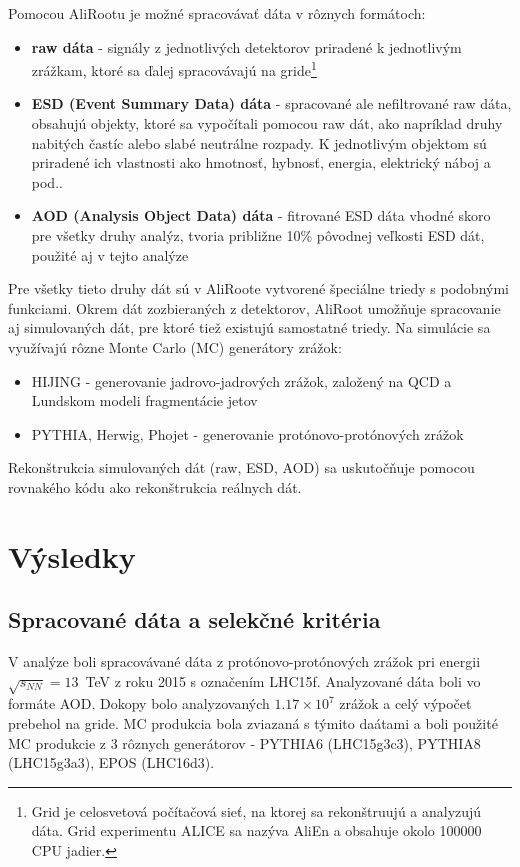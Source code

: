 \documentclass[thesismargins, thesislinespacing]{rnthesis}
\begin{document}
Pomocou AliRootu je možné spracovávať dáta v rôznych formátoch:
\begin{itemize}
	\item \textbf {raw dáta} - signály z jednotlivých detektorov priradené k jednotlivým zrážkam, ktoré sa ďalej spracovávajú na gride\footnote{Grid je celosvetová počítačová sieť, na ktorej sa rekonštruujú a analyzujú dáta. Grid experimentu ALICE sa nazýva AliEn a obsahuje okolo 100000 CPU jadier.} 
	\item \textbf {ESD (Event Summary Data) dáta} - spracované ale nefiltrované raw dáta, obsahujú objekty, ktoré sa vypočítali pomocou raw dát, ako napríklad druhy nabitých častíc alebo slabé neutrálne rozpady. K jednotlivým objektom sú priradené ich vlastnosti ako hmotnosť, hybnosť, energia, elektrický náboj a pod..
	\item \textbf {AOD (Analysis Object Data) dáta} - fitrované ESD dáta vhodné skoro pre všetky druhy analýz, tvoria približne 10\% pôvodnej veľkosti ESD dát, použité aj v tejto analýze
\end{itemize}

Pre všetky tieto druhy dát sú v AliRoote vytvorené špeciálne triedy s podobnými funkciami. Okrem dát zozbieraných z detektorov, AliRoot umožňuje spracovanie aj simulovaných dát, pre ktoré tiež existujú samostatné triedy. Na simulácie sa využívajú rôzne Monte Carlo (MC) generátory zrážok:
\begin{itemize}
	\item HIJING - generovanie jadrovo-jadrových zrážok, založený na QCD a Lundskom modeli fragmentácie jetov
	\item PYTHIA, Herwig, Phojet - generovanie protónovo-protónových zrážok
\end{itemize}

Rekonštrukcia simulovaných dát (raw, ESD, AOD) sa uskutočňuje pomocou rovnakého kódu ako rekonštrukcia reálnych dát.

\chapter{Výsledky}

\section{Spracované dáta a selekčné kritéria}
V analýze boli spracovávané dáta z protónovo-protónových zrážok pri energii $\sqrt{s_{NN}}=13$~TeV z roku 2015 s označením LHC15f. Analyzované dáta boli vo formáte AOD. Dokopy bolo analyzovaných $1.17\times10^7$ zrážok a celý výpočet prebehol na gride.
MC produkcia bola zviazaná s týmito daátami a boli použité MC produkcie z 3 rôznych generátorov - PYTHIA6 (LHC15g3c3), PYTHIA8 (LHC15g3a3), EPOS (LHC16d3). 
\end{document}
